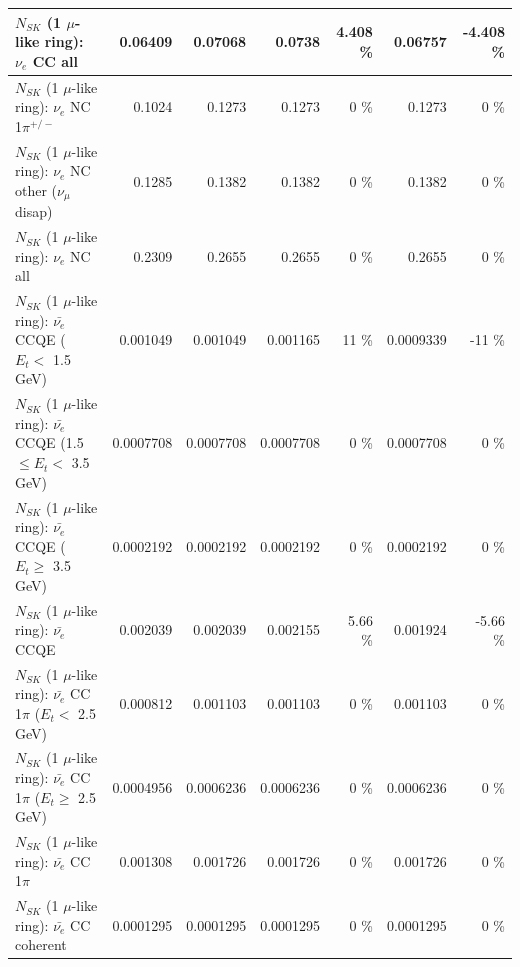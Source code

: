 \begin{table}
\begin{tabular}{| l | r | r | r  r | r  r |}
                                  $N_{SK}$ (1 $\mu$-like ring): $\nu_{e}$ CC all &         0.06409 &         0.07068 &          0.0738 &    4.408 \%  &         0.06757 &   -4.408 \%  \\ 
\hline
                           $N_{SK}$ (1 $\mu$-like ring): $\nu_e$ NC 1$\pi^{+/-}$ &          0.1024 &          0.1273 &          0.1273 &        0 \%  &          0.1273 &        0 \%  \\ 
                $N_{SK}$ (1 $\mu$-like ring): $\nu_e$ NC other ($\nu_\mu$ disap) &          0.1285 &          0.1382 &          0.1382 &        0 \%  &          0.1382 &        0 \%  \\ 
                                  $N_{SK}$ (1 $\mu$-like ring): $\nu_{e}$ NC all &          0.2309 &          0.2655 &          0.2655 &        0 \%  &          0.2655 &        0 \%  \\ 
\hline
\hline
\hline
            $N_{SK}$ (1 $\mu$-like ring): $\bar{\nu_e}$ CCQE ($E_{t} <$ 1.5 GeV) &        0.001049 &        0.001049 &        0.001165 &       11 \%  &       0.0009339 &      -11 \%  \\ 
   $N_{SK}$ (1 $\mu$-like ring): $\bar{\nu_e}$ CCQE (1.5 $\leq E_{t} <$ 3.5 GeV) &       0.0007708 &       0.0007708 &       0.0007708 &        0 \%  &       0.0007708 &        0 \%  \\ 
         $N_{SK}$ (1 $\mu$-like ring): $\bar{\nu_e}$ CCQE ($E_{t} \geq$ 3.5 GeV) &       0.0002192 &       0.0002192 &       0.0002192 &        0 \%  &       0.0002192 &        0 \%  \\ 
\hline
                                $N_{SK}$ (1 $\mu$-like ring): $\bar{\nu_e}$ CCQE &        0.002039 &        0.002039 &        0.002155 &     5.66 \%  &        0.001924 &    -5.66 \%  \\ 
\hline
       $N_{SK}$ (1 $\mu$-like ring): $\bar{\nu_e}$ CC 1$\pi$ ($E_{t} <$ 2.5 GeV) &        0.000812 &        0.001103 &        0.001103 &        0 \%  &        0.001103 &        0 \%  \\ 
    $N_{SK}$ (1 $\mu$-like ring): $\bar{\nu_e}$ CC 1$\pi$ ($E_{t} \geq$ 2.5 GeV) &       0.0004956 &       0.0006236 &       0.0006236 &        0 \%  &       0.0006236 &        0 \%  \\ 
\hline
                           $N_{SK}$ (1 $\mu$-like ring): $\bar{\nu_e}$ CC 1$\pi$ &        0.001308 &        0.001726 &        0.001726 &        0 \%  &        0.001726 &        0 \%  \\ 
                         $N_{SK}$ (1 $\mu$-like ring): $\bar{\nu_e}$ CC coherent &       0.0001295 &       0.0001295 &       0.0001295 &        0 \%  &       0.0001295 &        0 \%  \\ 

\end{tabular}
\end{table}
